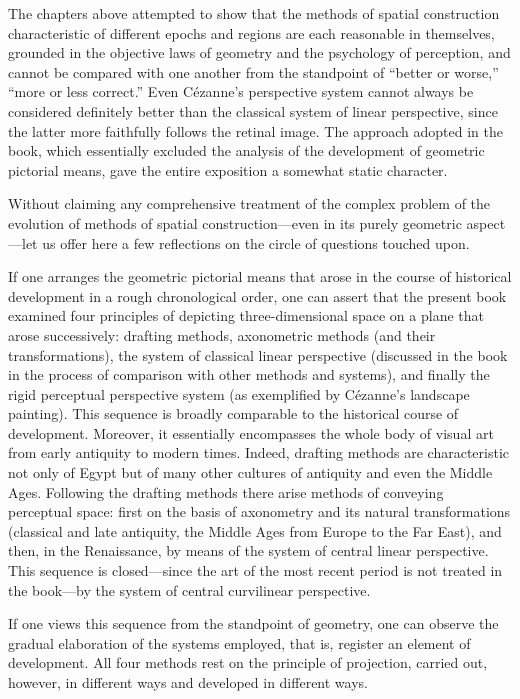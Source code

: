 The chapters above attempted to show that the methods of spatial construction
characteristic of different epochs and regions are each reasonable in themselves,
grounded in the objective laws of geometry and the psychology of perception, and cannot
be compared with one another from the standpoint of ``better or worse,'' ``more or less
correct.''  Even Cézanne's perspective system cannot always be considered definitely
better than the classical system of linear perspective, since the latter more faithfully
follows the retinal image.  The approach adopted in the book, which essentially excluded
the analysis of the development of geometric pictorial means, gave the entire exposition
a somewhat static character.

Without claiming any comprehensive treatment of the complex problem of the evolution of
methods of spatial construction---even in its purely geometric aspect---let us offer here
a few reflections on the circle of questions touched upon.

If one arranges the geometric pictorial means that arose in the course of historical
development in a rough chronological order, one can assert that the present book examined
four principles of depicting three-dimensional space on a plane that arose successively:
drafting methods, axonometric methods (and their transformations), the system of classical
linear perspective (discussed in the book in the process of comparison with other methods
and systems), and finally the rigid perceptual perspective system (as exemplified by
Cézanne's landscape painting).  This sequence is broadly comparable to the historical
course of development.  Moreover, it essentially encompasses the whole body of visual art
from early antiquity to modern times.  Indeed, drafting methods are characteristic not
only of Egypt but of many other cultures of antiquity and even the Middle Ages.  Following
the drafting methods there arise methods of conveying perceptual space: first on the basis
of axonometry and its natural transformations (classical and late antiquity, the Middle
Ages from Europe to the Far East), and then, in the Renaissance, by means of the system
of central linear perspective.  This sequence is closed---since the art of the most recent
period is not treated in the book---by the system of central curvilinear perspective.


If one views this sequence from the standpoint of geometry, one can observe the gradual
elaboration of the systems employed, that is, register an element of development.  All four
methods rest on the principle of projection, carried out, however, in different ways and
developed in different ways.

